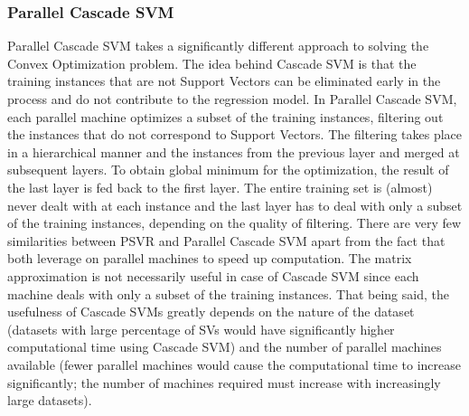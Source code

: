 \documentclass[12pt]{article}
\begin{document}
\subsubsection{Parallel Cascade SVM}
Parallel Cascade SVM takes a significantly different approach to solving the Convex Optimization problem. The idea behind Cascade SVM is that the training instances that are not Support Vectors can be eliminated early in the process and do not contribute to the regression model. In Parallel Cascade SVM, each parallel machine optimizes a subset of the training instances, filtering out the instances that do not correspond to Support Vectors. The filtering takes place in a hierarchical manner and the instances from the previous layer and merged at subsequent layers. To obtain global minimum for the optimization, the result of the last layer is fed back to the first layer. The entire training set is (almost) never dealt with at each instance and the last layer has to deal with only a subset of the training instances, depending on the quality of filtering.
\newline\newline
 There are very few similarities between PSVR and Parallel Cascade SVM apart from the fact that both leverage on parallel machines to speed up computation. The matrix approximation is not necessarily useful in case of Cascade SVM since each machine deals with only a subset of the training instances. That being said, the usefulness of Cascade SVMs greatly depends on the nature of the dataset (datasets with large percentage of SVs would have significantly higher computational time using Cascade SVM) and the number of parallel machines available (fewer parallel machines would cause the computational time to increase significantly; the number of machines required must increase with increasingly large datasets).
\cleardoublepage
\end{document}
